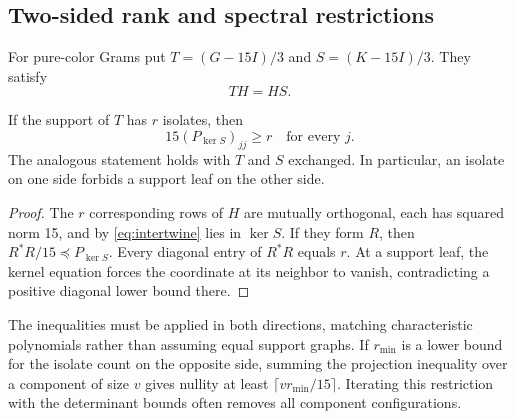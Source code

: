 \subsection{Two-sided rank and spectral restrictions}
For pure-color Grams put $T=(G-15I)/3$ and $S=(K-15I)/3$. They satisfy
\begin{equation}\label{eq:intertwine}
 TH=HS.
\end{equation}
\begin{lemma}\label{lem:projection}
If the support of $T$ has $r$ isolates, then
\[
 15(P_{\ker S})_{jj}\ge r\quad\text{for every }j.
\]
The analogous statement holds with $T$ and $S$ exchanged. In particular, an isolate on one side forbids a support leaf on the other side.
\end{lemma}
\begin{proof}
The $r$ corresponding rows of $H$ are mutually orthogonal, each has squared norm 15, and by \eqref{eq:intertwine} lies in $\ker S$. If they form $R$, then $R^*R/15\preceq P_{\ker S}$. Every diagonal entry of $R^*R$ equals $r$. At a support leaf, the kernel equation forces the coordinate at its neighbor to vanish, contradicting a positive diagonal lower bound there.
\end{proof}
The inequalities must be applied in both directions, matching characteristic polynomials rather than assuming equal support graphs. If $r_{\min}$ is a lower bound for the isolate count on the opposite side, summing the projection inequality over a component of size $v$ gives nullity at least $\lceil vr_{\min}/15\rceil$. Iterating this restriction with the determinant bounds often removes all component configurations.

